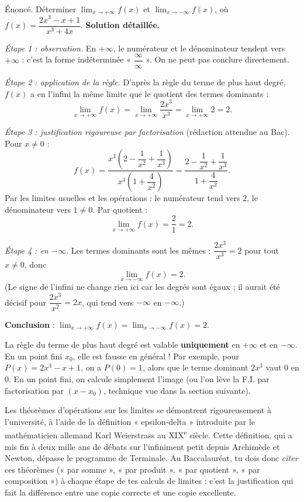 \documentclass[11pt]{article}
\begin{document}
\begin{exoresolu}
Énoncé. Déterminer $\displaystyle\lim_{x \to +\infty} f(x)$ et $\displaystyle\lim_{x \to -\infty} f(x)$, où $f(x) = \dfrac{2x^3 - x + 1}{x^3 + 4x}$.
\tcblower
\textbf{Solution détaillée.}

\emph{Étape 1 : observation.} En $+\infty$, le numérateur et le dénominateur tendent vers $+\infty$ : c'est la forme indéterminée « $\dfrac{\infty}{\infty}$ ». On ne peut pas conclure directement.

\emph{Étape 2 : application de la règle.} D'après la règle du terme de plus haut degré, $f(x)$ a en l'infini la même limite que le quotient des termes dominants :
\[ \lim_{x \to +\infty} f(x) = \lim_{x \to +\infty} \dfrac{2x^3}{x^3} = \lim_{x \to +\infty} 2 = 2. \]

\emph{Étape 3 : justification rigoureuse par factorisation} (rédaction attendue au Bac). Pour $x \neq 0$ :
\[ f(x) = \dfrac{x^3\left(2 - \dfrac{1}{x^2} + \dfrac{1}{x^3}\right)}{x^3\left(1 + \dfrac{4}{x^2}\right)} = \dfrac{2 - \dfrac{1}{x^2} + \dfrac{1}{x^3}}{1 + \dfrac{4}{x^2}}. \]
Par les limites usuelles et les opérations : le numérateur tend vers $2$, le dénominateur vers $1 \neq 0$. Par quotient :
\[ \lim_{x \to +\infty} f(x) = \dfrac{2}{1} = 2. \]

\emph{Étape 4 : en $-\infty$.} Les termes dominants sont les mêmes : $\dfrac{2x^3}{x^3} = 2$ pour tout $x \neq 0$, donc
\[ \lim_{x \to -\infty} f(x) = 2. \]
(Le signe de l'infini ne change rien ici car les degrés sont égaux ; il aurait été décisif pour $\dfrac{2x^3}{x^2} = 2x$, qui tend vers $-\infty$ en $-\infty$.)

\textbf{Conclusion} : $\lim_{x \to +\infty} f(x) = \lim_{x \to -\infty} f(x) = 2$.
\end{exoresolu}

\begin{attention}
La règle du terme de plus haut degré est valable \textbf{uniquement} en $+\infty$ et en $-\infty$. En un point fini $x_0$, elle est fausse en général ! Par exemple, pour $P(x) = 2x^3 - x + 1$, on a $P(0) = 1$, alors que le terme dominant $2x^3$ vaut $0$ en $0$. En un point fini, on calcule simplement l'image (ou l'on lève la F.I. par factorisation par $(x - x_0)$, technique vue dans la section suivante).
\end{attention}

\begin{savaistu}
Les théorèmes d'opérations sur les limites se démontrent rigoureusement à l'université, à l'aide de la définition « epsilon-delta » introduite par le mathématicien allemand Karl Weierstrass au XIX\textsuperscript{e} siècle. Cette définition, qui a mis fin à deux mille ans de débats sur l'infiniment petit depuis Archimède et Newton, dépasse le programme de Terminale. Au Baccalauréat, tu dois donc \emph{citer} ces théorèmes (« par somme », « par produit », « par quotient », « par composition ») à chaque étape de tes calculs de limites : c'est la justification qui fait la différence entre une copie correcte et une copie excellente.
\end{savaistu}
\end{document}
